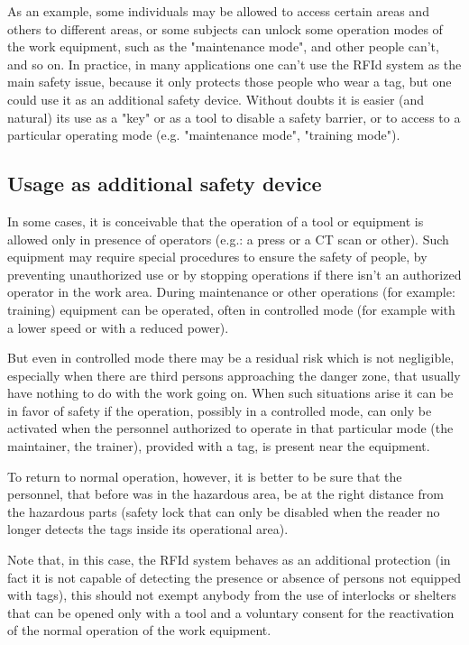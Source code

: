 \vspace*{1pc}
As an example, some individuals may be allowed to access certain areas and others to different areas, or some subjects can unlock some operation modes of the work equipment, such as the "maintenance mode", and other people can’t, and so on. In practice, in many applications one can’t use the RFId system as the main safety issue, because it only protects those people who wear a tag, but one could use it as an additional safety device. Without doubts it is easier (and natural) its use as a "key" or as a tool to disable a safety barrier, or to access to a particular operating mode (e.g. "maintenance mode", "training mode").

\subsection[Usage as additional safety device]{Usage as additional safety device}

In some cases, it is conceivable that the operation of a tool or equipment is allowed only in presence of operators (e.g.: a press or a CT scan or other). Such equipment may require special procedures to ensure the safety of people, by preventing unauthorized use or by stopping operations if there isn’t an authorized operator in the work area. During maintenance or other operations (for example: training) equipment can be operated, often in controlled mode (for example with a lower speed or with a reduced power). 

\vspace*{1pc}
But even in controlled mode there may be a residual risk which is not negligible, especially when there are third persons approaching the danger zone, that usually have nothing to do with the work going on. When such situations arise it can be in favor of safety if the operation, possibly in a controlled mode, can only be activated when the personnel authorized to operate in that particular mode (the maintainer, the trainer), provided with a tag, is present near the equipment. 

\vspace*{1pc}
To return to normal operation, however, it is better to be sure that the personnel, that before was in the hazardous area, be at the right distance from the hazardous parts (safety lock that can only be disabled when the reader no longer detects the tags inside its operational area). 

\vspace*{1pc}
Note that, in this case, the RFId system behaves as an additional protection (in fact it is not capable of detecting the presence or absence of persons not equipped with tags), this should not exempt anybody from the use of interlocks or shelters that can be opened only with a tool and a voluntary consent for the reactivation of the normal operation of the work equipment. 

